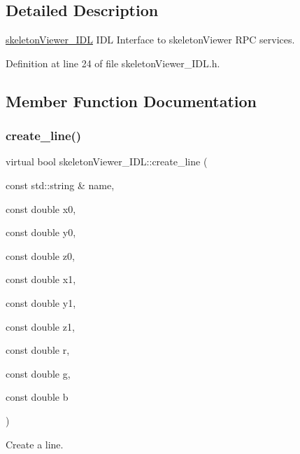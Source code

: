 \subsection{Detailed Description}
\hyperlink{classskeletonViewer__IDL}{skeleton\+Viewer\+\_\+\+I\+DL} I\+DL Interface to skeleton\+Viewer R\+PC services. 

Definition at line 24 of file skeleton\+Viewer\+\_\+\+I\+D\+L.\+h.



\subsection{Member Function Documentation}
\mbox{\label{classskeletonViewer__IDL_ae893be656a21bfd75682fd4efb20a2d8}} 
\subsubsection{\texorpdfstring{create\+\_\+line()}{create\_line()}}
{\footnotesize\ttfamily virtual bool skeleton\+Viewer\+\_\+\+I\+D\+L\+::create\+\_\+line (\begin{DoxyParamCaption}\item[{const std\+::string \&}]{name,  }\item[{const double}]{x0,  }\item[{const double}]{y0,  }\item[{const double}]{z0,  }\item[{const double}]{x1,  }\item[{const double}]{y1,  }\item[{const double}]{z1,  }\item[{const double}]{r,  }\item[{const double}]{g,  }\item[{const double}]{b }\end{DoxyParamCaption})\hspace{0.3cm}{\ttfamily [virtual]}}



Create a line. 


